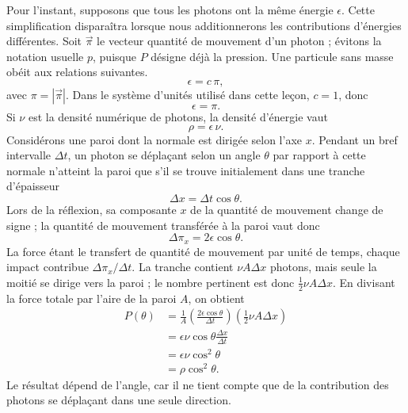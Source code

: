 Pour l’instant, supposons que tous les photons ont la même énergie \(\epsilon\). Cette simplification disparaîtra lorsque nous additionnerons les contributions d’énergies différentes. Soit \(\vec{\pi}\) le vecteur quantité de mouvement d’un photon ; évitons la notation usuelle \(p\), puisque \(P\) désigne déjà la pression. Une particule sans masse obéit aux relations suivantes.
\begin{equation}
\epsilon=c\,\pi,
\end{equation}
avec \(\pi=|\vec{\pi}|\). Dans le système d’unités utilisé dans cette leçon, \(c=1\), donc
\begin{equation}
\epsilon=\pi.
\end{equation}
Si \(\nu\) est la densité numérique de photons, la densité d’énergie vaut
\begin{equation}
\rho=\epsilon\,\nu.
\end{equation}
Considérons une paroi dont la normale est dirigée selon l’axe \(x\). Pendant un bref intervalle \(\Delta t\), un photon se déplaçant selon un angle \(\theta\) par rapport à cette normale n’atteint la paroi que s’il se trouve initialement dans une tranche d’épaisseur
\begin{equation}
\Delta x=\Delta t\cos\theta.
\end{equation}
Lors de la réflexion, sa composante \(x\) de la quantité de mouvement change de signe ; la quantité de mouvement transférée à la paroi vaut donc
\begin{equation}
\Delta \pi_x=2\epsilon\cos\theta.
\end{equation}
La force étant le transfert de quantité de mouvement par unité de temps, chaque impact contribue \(\Delta \pi_x/\Delta t\). La tranche contient \(\nu A\Delta x\) photons, mais seule la moitié se dirige vers la paroi ; le nombre pertinent est donc \(\tfrac12 \nu A\Delta x\). En divisant la force totale par l’aire de la paroi \(A\), on obtient
\begin{align}
P(\theta)
&=
\frac{1}{A}
\left(\frac{2\epsilon\cos\theta}{\Delta t}\right)
\left(\frac12 \nu A\Delta x\right) \\
&=
\epsilon\nu\cos\theta\frac{\Delta x}{\Delta t} \\
&=
\epsilon\nu\cos^2\theta \\
&=
\rho\cos^2\theta.
\end{align}
Le résultat dépend de l’angle, car il ne tient compte que de la contribution des photons se déplaçant dans une seule direction.

